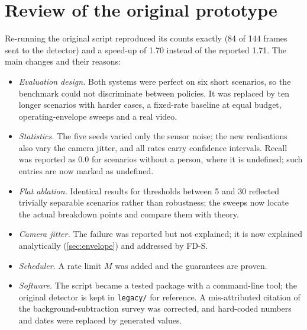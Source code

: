 \documentclass[12pt,a4paper]{article}
\theoremstyle{plain}
\theoremstyle{definition}
\newcommand{\code}[1]{\texttt{#1}}
\newcommand{\FDS}{FD-S}
\begin{document}
\section{Review of the original prototype}\label{app:review}
Re-running the original script reproduced its counts exactly (84 of 144 frames sent to the detector) and a speed-up of 1.70 instead of the reported 1.71. The main changes and their reasons:
\begin{itemize}
\item \emph{Evaluation design.} Both systems were perfect on six short scenarios, so the benchmark could not discriminate between policies. It was replaced by ten longer scenarios with harder cases, a fixed-rate baseline at equal budget, operating-envelope sweeps and a real video.
\item \emph{Statistics.} The five seeds varied only the sensor noise; the new realisations also vary the camera jitter, and all rates carry confidence intervals. Recall was reported as 0.0 for scenarios without a person, where it is undefined; such entries are now marked as undefined.
\item \emph{Flat ablation.} Identical results for thresholds between 5 and 30 reflected trivially separable scenarios rather than robustness; the sweeps now locate the actual breakdown points and compare them with theory.
\item \emph{Camera jitter.} The failure was reported but not explained; it is now explained analytically (\cref{sec:envelope}) and addressed by \FDS.
\item \emph{Scheduler.} A rate limit $M$ was added and the guarantees are proven.
\item \emph{Software.} The script became a tested package with a command-line tool; the original detector is kept in \code{legacy/} for reference. A mis-attributed citation of the background-subtraction survey was corrected, and hard-coded numbers and dates were replaced by generated values.
\end{itemize}


\clearpage
{}
{}
\listoffigures

\clearpage
{}
{}
\listoftables
\end{document}
